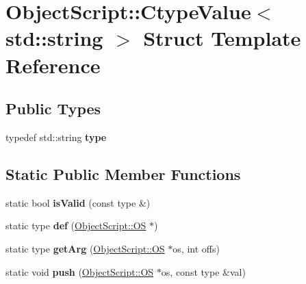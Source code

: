 \hypertarget{struct_object_script_1_1_ctype_value_3_01std_1_1string_01_4}{}\section{Object\+Script\+:\+:Ctype\+Value$<$ std\+:\+:string $>$ Struct Template Reference}
\label{struct_object_script_1_1_ctype_value_3_01std_1_1string_01_4}
\subsection*{Public Types}
\begin{DoxyCompactItemize}
\item 
typedef std\+::string {\bfseries type}\hypertarget{struct_object_script_1_1_ctype_value_3_01std_1_1string_01_4_a52beec06fe8439b79fa4d174bdb50a4f}{}\label{struct_object_script_1_1_ctype_value_3_01std_1_1string_01_4_a52beec06fe8439b79fa4d174bdb50a4f}

\end{DoxyCompactItemize}
\subsection*{Static Public Member Functions}
\begin{DoxyCompactItemize}
\item 
static bool {\bfseries is\+Valid} (const type \&)\hypertarget{struct_object_script_1_1_ctype_value_3_01std_1_1string_01_4_a7bead182e9e06959d4a6d9b518b1db0e}{}\label{struct_object_script_1_1_ctype_value_3_01std_1_1string_01_4_a7bead182e9e06959d4a6d9b518b1db0e}

\item 
static type {\bfseries def} (\hyperlink{class_object_script_1_1_o_s}{Object\+Script\+::\+OS} $\ast$)\hypertarget{struct_object_script_1_1_ctype_value_3_01std_1_1string_01_4_ac4628986e2ad6cc416cdad6acd24a461}{}\label{struct_object_script_1_1_ctype_value_3_01std_1_1string_01_4_ac4628986e2ad6cc416cdad6acd24a461}

\item 
static type {\bfseries get\+Arg} (\hyperlink{class_object_script_1_1_o_s}{Object\+Script\+::\+OS} $\ast$os, int offs)\hypertarget{struct_object_script_1_1_ctype_value_3_01std_1_1string_01_4_a9516f4649ee6f03263fb3d4d33af4f07}{}\label{struct_object_script_1_1_ctype_value_3_01std_1_1string_01_4_a9516f4649ee6f03263fb3d4d33af4f07}

\item 
static void {\bfseries push} (\hyperlink{class_object_script_1_1_o_s}{Object\+Script\+::\+OS} $\ast$os, const type \&val)\hypertarget{struct_object_script_1_1_ctype_value_3_01std_1_1string_01_4_af3599c98de5e834f3a81ed014c2ed2a7}{}\label{struct_object_script_1_1_ctype_value_3_01std_1_1string_01_4_af3599c98de5e834f3a81ed014c2ed2a7}

\end{DoxyCompactItemize}


